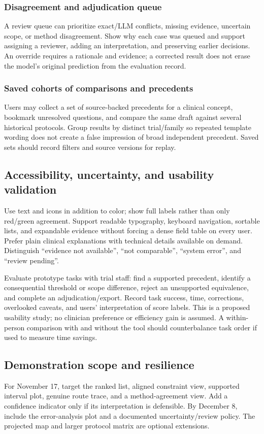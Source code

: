 \documentclass[10pt,letterpaper]{article}
\begin{document}
\subsubsection{Disagreement and adjudication queue}
A review queue can prioritize exact/LLM conflicts, missing evidence, uncertain
scope, or method disagreement. Show why each case was queued and support
assigning a reviewer, adding an interpretation, and preserving earlier
decisions. An override requires a rationale and evidence; a corrected result
does not erase the model's original prediction from the evaluation record.

\subsubsection{Saved cohorts of comparisons and precedents}
Users may collect a set of source-backed precedents for a clinical concept,
bookmark unresolved questions, and compare the same draft against several
historical protocols. Group results by distinct trial/family so repeated
template wording does not create a false impression of broad independent
precedent. Saved sets should record filters and source versions for replay.

\subsection{Accessibility, uncertainty, and usability validation}
Use text and icons in addition to color; show full labels rather than only
red/green agreement. Support readable typography, keyboard navigation,
sortable lists, and expandable evidence without forcing a dense field table
on every user. Prefer plain clinical explanations with technical details
available on demand. Distinguish ``evidence not available'', ``not comparable'',
``system error'', and ``review pending''.

Evaluate prototype tasks with trial staff: find a supported precedent, identify
a consequential threshold or scope difference, reject an unsupported
equivalence, and complete an adjudication/export. Record task success,
time, corrections, overlooked caveats, and users' interpretation of score
labels. This is a proposed usability study; no clinician preference or
efficiency gain is assumed. A within-person comparison with and without the
tool should counterbalance task order if used to measure time savings.

\subsection{Demonstration scope and resilience}
For November 17, target the ranked list, aligned constraint view, supported
interval plot, genuine route trace, and a method-agreement view. Add a
confidence indicator only if its interpretation is defensible. By December 8,
include the error-analysis plot and a documented uncertainty/review policy.
The projected map and larger protocol matrix are optional extensions.
\end{document}
